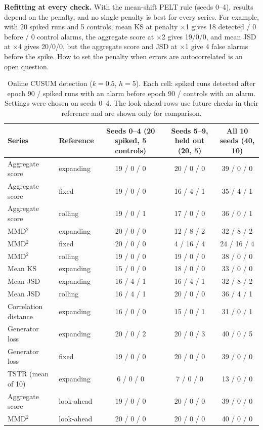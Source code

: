 \documentclass[conference]{IEEEtran}
\newcommand{\x}{$\times$}
\begin{document}
\textbf{Refitting at every check.} With the mean-shift PELT rule (seeds
0--4), results depend on the penalty, and no single penalty is best for every
series. For example, with 20 spiked runs and 5 controls, mean KS at
penalty \x1 gives 18 detected / 0 before / 0 control alarms, the aggregate
score at \x2 gives 19/0/0, and mean JSD at \x4 gives 20/0/0, but the
aggregate score and JSD at \x1 give 4 false alarms before the spike. How to
set the penalty when errors are autocorrelated is an open question.

\begin{table}[t]
\caption{Online CUSUM detection ($k=0.5$, $h=5$). Each cell: spiked runs
detected after epoch 90 / spiked runs with an alarm before epoch 90 /
controls with an alarm. Settings were chosen on seeds 0--4. The look-ahead
rows use future checks in their reference and are shown only for
comparison.}
\label{tab:detect}
\centering
\begin{tabular}{llccc}
\toprule
Series & Reference & Seeds 0--4 (20 spiked, 5 controls) & Seeds 5--9, held out (20, 5) & All 10 seeds (40, 10) \\
\midrule
Aggregate score & expanding & 19 / 0 / 0 & 20 / 0 / 0 & 39 / 0 / 0 \\
Aggregate score & fixed & 19 / 0 / 0 & 16 / 4 / 1 & 35 / 4 / 1 \\
Aggregate score & rolling & 19 / 0 / 1 & 17 / 0 / 0 & 36 / 0 / 1 \\
MMD$^2$ & expanding & 20 / 0 / 0 & 12 / 8 / 2 & 32 / 8 / 2 \\
MMD$^2$ & fixed & 20 / 0 / 0 & 4 / 16 / 4 & 24 / 16 / 4 \\
MMD$^2$ & rolling & 19 / 0 / 0 & 19 / 0 / 0 & 38 / 0 / 0 \\
Mean KS & expanding & 15 / 0 / 0 & 18 / 0 / 0 & 33 / 0 / 0 \\
Mean JSD & expanding & 16 / 4 / 1 & 16 / 4 / 1 & 32 / 8 / 2 \\
Mean JSD & rolling & 16 / 4 / 1 & 20 / 0 / 0 & 36 / 4 / 1 \\
Correlation distance & expanding & 16 / 0 / 0 & 15 / 0 / 1 & 31 / 0 / 1 \\
Generator loss & expanding & 20 / 0 / 2 & 20 / 0 / 3 & 40 / 0 / 5 \\
Generator loss & fixed & 19 / 0 / 0 & 20 / 0 / 0 & 39 / 0 / 0 \\
TSTR (mean of 10) & expanding & 6 / 0 / 0 & 7 / 0 / 0 & 13 / 0 / 0 \\
\midrule
Aggregate score & look-ahead & 19 / 0 / 0 & 20 / 0 / 0 & 39 / 0 / 0 \\
MMD$^2$ & look-ahead & 20 / 0 / 0 & 20 / 0 / 0 & 40 / 0 / 0 \\
\bottomrule
\end{tabular}
\end{table}
\end{document}
